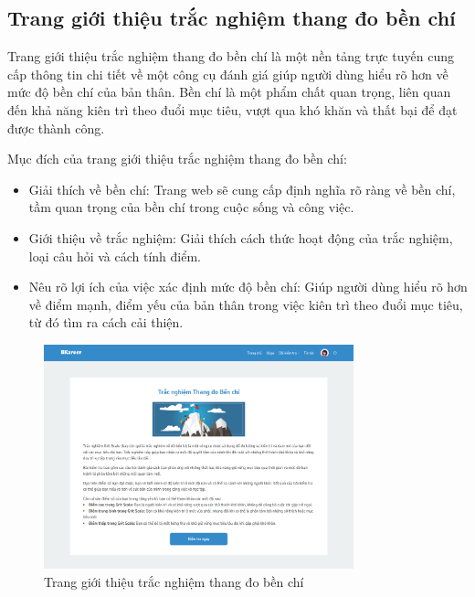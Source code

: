 \subsection{Trang giới thiệu trắc nghiệm thang đo bền chí}
Trang giới thiệu trắc nghiệm thang đo bền chí là một nền tảng trực tuyến cung cấp thông tin chi tiết về một công cụ đánh giá giúp người dùng hiểu rõ hơn về mức độ bền chí của bản thân. Bền chí là một phẩm chất quan trọng, liên quan đến khả năng kiên trì theo đuổi mục tiêu, vượt qua khó khăn và thất bại để đạt được thành công.

Mục đích của trang giới thiệu trắc nghiệm thang đo bền chí:
\begin{itemize}
    \item Giải thích về bền chí: Trang web sẽ cung cấp định nghĩa rõ ràng về bền chí, tầm quan trọng của bền chí trong cuộc sống và công việc.
    \item Giới thiệu về trắc nghiệm: Giải thích cách thức hoạt động của trắc nghiệm, loại câu hỏi và cách tính điểm.
    \item Nêu rõ lợi ích của việc xác định mức độ bền chí: Giúp người dùng hiểu rõ hơn về điểm mạnh, điểm yếu của bản thân trong việc kiên trì theo đuổi mục tiêu, từ đó tìm ra cách cải thiện.
\end{itemize}

\begin{figure}[H]
    \centering
    \includegraphics[width=0.8\textwidth]{images/chap5/gritDetail.png}
    \vspace{0.5cm}
    \caption{Trang giới thiệu trắc nghiệm thang đo bền chí}
\end{figure}

